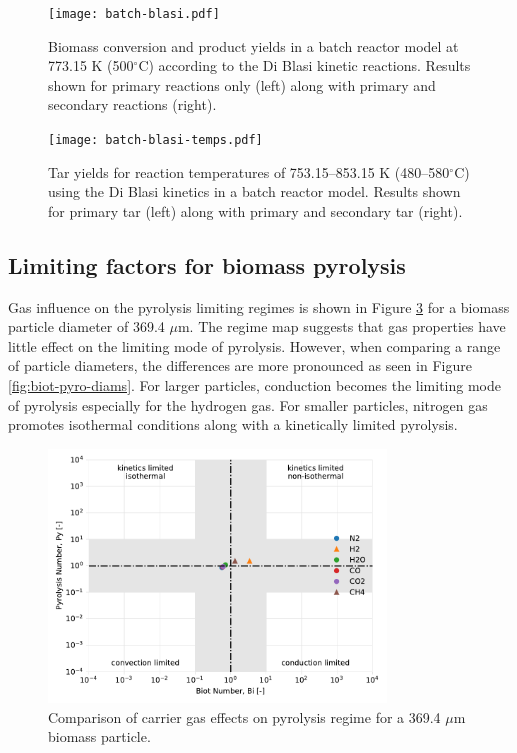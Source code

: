 \begin{figure}[H]
    \centering
    \texttt{[image: batch-blasi.pdf]}
    \caption{Biomass conversion and product yields in a batch reactor model at 773.15 K (500$^\circ$C) according to the Di Blasi kinetic reactions. Results shown for primary reactions only (left) along with primary and secondary reactions (right).}
    \label{fig:batch-blasi}
\end{figure}

\begin{figure}[H]
    \centering
    \texttt{[image: batch-blasi-temps.pdf]}
    \caption{Tar yields for reaction temperatures of 753.15--853.15 K (480--580$^\circ$C) using the Di Blasi kinetics in a batch reactor model. Results shown for primary tar (left) along with primary and secondary tar (right).}
    \label{fig:batch-blasi-temps}
\end{figure}


\subsection{Limiting factors for biomass pyrolysis}

Gas influence on the pyrolysis limiting regimes is shown in Figure \ref{fig:biot-pyro-gases} for a biomass particle diameter of 369.4 $\mu$m. The regime map suggests that gas properties have little effect on the limiting mode of pyrolysis. However, when comparing a range of particle diameters, the differences are more pronounced as seen in Figure \ref{fig:biot-pyro-diams}. For larger particles, conduction becomes the limiting mode of pyrolysis especially for the hydrogen gas. For smaller particles, nitrogen gas promotes isothermal conditions along with a kinetically limited pyrolysis.

\begin{figure}[H]
    \centering
    \includegraphics[width=0.8\textwidth]{figures/biot-pyro-gases.pdf}
    \caption{Comparison of carrier gas effects on pyrolysis regime for a 369.4 $\mu$m biomass particle.}
    \label{fig:biot-pyro-gases}
\end{figure}

